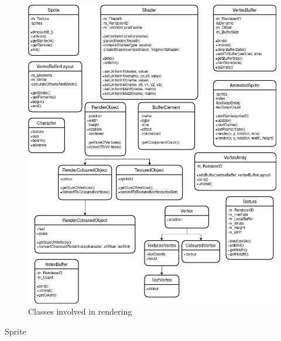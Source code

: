 \documentclass[../../Main.tex]{subfiles}
\begin{document}
    \begin{figure}[hbt!]
        \centerline{\includegraphics[scale=0.5]{img/Classes/Rendering Utils.png}}
        \caption{Classes involved in rendering}
        \label{fig}
    \end{figure}
    Sprite
\end{document}
